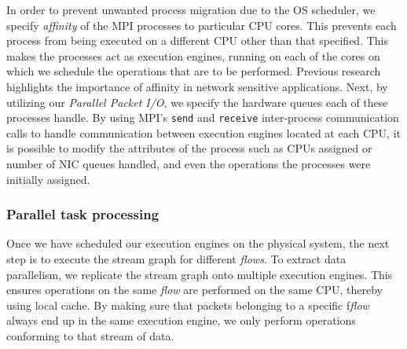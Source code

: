 \documentclass[10pt, conference, compsocconf, reqno]{IEEEtran}
\newcommand{\comment}[1]{}
\begin{document}
In order to prevent unwanted process migration due to the OS scheduler, we specify \textit{affinity} of the MPI processes to particular CPU cores. This prevents each process from being executed on a different CPU other than that specified. This makes the processes act as execution engines, running on each of the cores on which we schedule the operations that are to be performed. Previous research \cite{Salehi:1996:EAS:234766.234769}\cite{1409136} highlights the importance of affinity in network sensitive applications. Next, by utilizing our \textit{Parallel Packet I/O}, we specify the hardware queues each of these processes handle. \comment{Initially we divide the queues evenly among the different processes we create, but later during execution we could modify the allocation based on the application operations scheduled on them. Our modifications to \texttt{netmap}'s hardware queue assignment API can help us here in redistributing the queues to different processes.} By using MPI's \texttt{send} and \texttt{receive} inter-process communication calls to handle communication between execution engines located at each CPU, it is possible to modify the attributes of the process such as CPUs assigned or number of NIC queues handled, and even the operations the processes were initially assigned.

\subsubsection{Parallel task processing}
\label{ppt}

Once we have scheduled our execution engines on the physical system, the next step is to execute the stream graph for different \textit{flows}. To extract data parallelism, we replicate the stream graph onto multiple execution engines. This ensures operations on the same \textit{flow} are performed on the same CPU, thereby using local cache. By making sure that packets belonging to a specific f\textit{flow} always end up in the same execution engine, we only perform operations conforming to that stream of data. \comment{We use the ability of modern NICs to classify packets onto different queues, based on their attributes.}


\comment{
\lstset{language=C,caption={Packet Payload Modification Function},label=payload_sub}
\begin{lstlisting}
bool payload_copy( const void *payload_data, uint32_t length )
{
    uint32_t headroom = _data - _head;
    uint32_t tailroom = _end - _tail;
    uint32_t orig_length = _tail - _data;
    uint32_t n = length + headroom + tailroom;
    if( n < min_buffer_length )
    {
        tailroom = min_buffer_length - length - headroom;
        n = min_buffer_length;
    }
    _data = _head + headroom;
    _tail = _data + length;
    if( payload_data )
        memcpy( _data, payload_data, length );
    return true;
}
\end{lstlisting}
}
\end{document}
